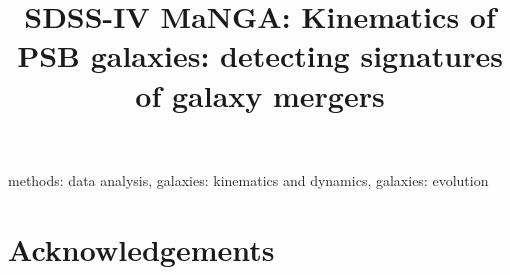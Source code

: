 \documentclass[11pt,fleqn,usenatbib]{mnras} %
\title[Kinematics of PSB galaxies]{SDSS-IV MaNGA: Kinematics of PSB galaxies: detecting signatures of galaxy mergers}
\begin{document}



\begingroup
\let\clearpage\relax
\tableofcontents
\listoftables
\listoffigures
\endgroup



\label{firstpage}
\pagerange{\pageref{firstpage}--\pageref{lastpage}}
\maketitle

\newpage

\begin{abstract}

\end{abstract}

\begin{keywords}
methods: data analysis, galaxies: kinematics and dynamics, galaxies: evolution
\end{keywords}




% 



% 













\section*{Acknowledgements}

\end{document}
